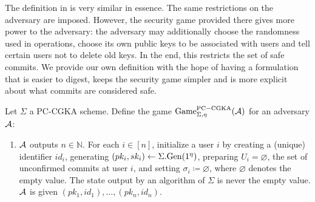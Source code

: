 The definition in \cite[Section B.1]{modular-group-messaging} is very similar in essence. The same restrictions on the adversary are imposed. However, the security game provided there gives more power to the adversary: the adversary may additionally choose the randomness used in operations, choose its own public keys to be associated with users and tell certain users not to delete old keys. In the end, this restricts the set of safe commits. We provide our own definition with the hope of having a formulation that is easier to digest, keeps the security game simpler and is more explicit about what commits are considered safe.

\begin{definition}
	Let $\Sigma$ a PC-CGKA scheme. Define the game $\mathrm{Game}_{\Sigma, \eta}^{\mathrm{PC-CGKA}}(\mathcal{A})$ for an adversary $\mathcal{A}$:
	\begin{enumerate}[1.]
		\item \label{def:cgka-game-step-init} $\mathcal{A}$ outputs $n \in \mathbb{N}$. For each $i \in [n]$, initialize a user $i$ by creating a (unique) identifier $id_i$, generating $(pk_i, sk_i) \leftarrow \Sigma.\mathrm{Gen}(1^\eta)$, preparing $U_i = \varnothing$, the set of unconfirmed commits at user $i$, and setting $\sigma_i \coloneqq \varnothing$, where $\varnothing$ denotes the empty value. The state output by an algorithm of $\Sigma$ is never the empty value. $\mathcal{A}$ is given $(pk_1, id_1), \ldots, (pk_n, id_n)$.


\end{enumerate}
\end{definition}

